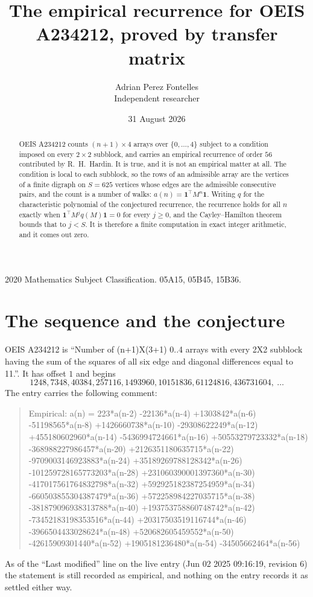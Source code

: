 \documentclass[11pt,a4paper]{article}
\title{The empirical recurrence for OEIS A234212, proved by transfer matrix}
\author{Adrian Perez Fontelles\\ \small Independent researcher}
\date{31 August 2026}
\theoremstyle{plain}
\theoremstyle{definition}
\begin{document}
\maketitle

\begin{abstract}
OEIS A234212 counts $(n+1)\times4$ arrays over $\{0,\dots,4\}$ subject to a condition imposed on
every $2\times2$ subblock, and carries an empirical recurrence of order $56$ contributed
by R.~H.~Hardin. It is true, and it is not an empirical matter at all. The condition is local
to each subblock, so the rows of an admissible array are the vertices of a finite digraph
on $S=625$ vertices whose edges are the admissible consecutive pairs, and the count is a
number of walks: $a(n)=\mathbf{1}^{\!\top}M^{n}\mathbf{1}$. Writing $q$
for the characteristic polynomial of the conjectured recurrence, the recurrence holds for all
$n$ exactly when $\mathbf{1}^{\!\top}M^{j}q(M)\mathbf{1}=0$ for every $j\ge0$, and the
Cayley--Hamilton theorem bounds that to $j<S$. It is therefore a finite computation in exact
integer arithmetic, and it comes out zero.
\end{abstract}

\noindent\small 2020 Mathematics Subject Classification. 05A15, 05B45, 15B36.\normalsize

\section{The sequence and the conjecture}

OEIS A234212 is ``Number of (n+1)X(3+1) 0..4 arrays with every 2X2 subblock having the sum of the squares of all six edge and diagonal differences equal to 11.''. It has offset $1$ and begins
\[
1248, 7348, 40384, 257116, 1493960, 10151836, 61124816, 436731604,\ \dots
\]
The entry carries the following comment:
\begin{quote}\small
Empirical: a(n) = 223*a(n-2) -22136*a(n-4) +1303842*a(n-6) -51198565*a(n-8) +1426660738*a(n-10) -29308622249*a(n-12) +455180602960*a(n-14) -5436994724661*a(n-16) +50553279723332*a(n-18) -368988227986457*a(n-20) +2126351180635715*a(n-22) -9709003146923883*a(n-24) +35189269788128342*a(n-26) -101259728165773203*a(n-28) +231060390001397360*a(n-30) -417017561764832798*a(n-32) +592925182387254959*a(n-34) -660503855304387479*a(n-36) +572258984227035715*a(n-38) -381879096938313788*a(n-40) +193753758860748742*a(n-42) -73452183198353516*a(n-44) +20317503519116744*a(n-46) -3966504433028624*a(n-48) +520682605459552*a(n-50) -42615909301440*a(n-52) +1905181236480*a(n-54) -34505662464*a(n-56)
\end{quote}
As of the ``Last modified'' line on the live entry (Jun 02 2025 09:16:19, revision 6) the statement is
still recorded as empirical, and nothing on the entry records it as settled either way.
\end{document}
